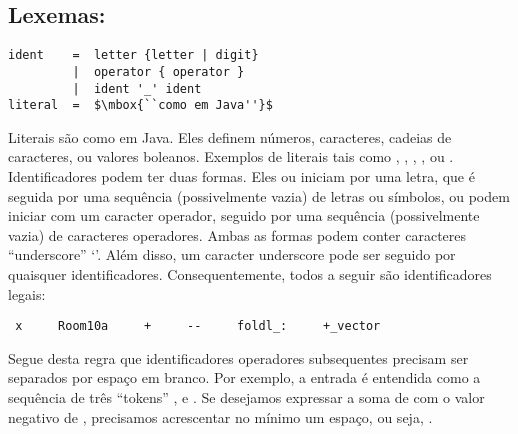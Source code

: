 \subsection*{Lexemas:}

\begin{lstlisting}
ident    =  letter {letter | digit}
         |  operator { operator }
         |  ident '_' ident
literal  =  $\mbox{``como em Java''}$
\end{lstlisting}

Literais s\~{a}o como em Java. Eles definem n\'{u}meros, caracteres, cadeias de caracteres, ou 
valores boleanos. Exemplos de literais tais como , , ,
, ou .
Identificadores podem ter duas formas. Eles ou iniciam por uma letra, que \'{e} 
seguida por uma sequ\^{e}ncia (possivelmente vazia) de letras ou s\'{i}mbolos, ou podem 
iniciar com um caracter operador, seguido por uma sequ\^{e}ncia (possivelmente vazia) de
caracteres operadores. Ambas as formas podem conter caracteres ``underscore'' `\code{_}'.
Al\'{e}m disso, um caracter underscore pode ser seguido por quaisquer identificadores.
Consequentemente, todos a seguir s\~{a}o identificadores legais:  
 \begin{lstlisting}
 x     Room10a     +     --     foldl_:     +_vector
 \end{lstlisting}
Segue desta regra que identificadores operadores subsequentes precisam ser
separados por espa\c{c}o em branco. Por exemplo, a entrada  \'{e} entendida 
como a sequ\^{e}ncia de tr\^{e}s ``tokens'' , \code{+-} e . Se
desejamos expressar a soma de  com o valor negativo de , 
precisamos acrescentar no m\'{i}nimo um espa\c{c}o, ou seja, .      

